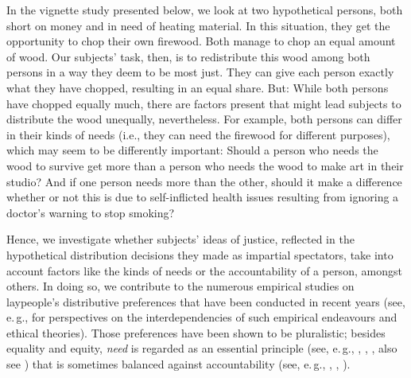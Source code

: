 \documentclass[egregdoesnotlikesansseriftitles]{scrartcl}
\begin{document}
In the vignette study presented below, we look at two hypothetical persons, both short on money and in need of heating material.
In this situation, they get the opportunity to chop their own firewood.
Both manage to chop an equal amount of wood.
Our subjects' task, then, is to redistribute this wood among both persons in a way they deem to be most just.
They can give each person exactly what they have chopped, resulting in an equal share.
But: While both persons have chopped equally much, there are factors present that might lead subjects to distribute the wood unequally, nevertheless.
For example, both persons can differ in their kinds of needs (i.e., they can need the firewood for different purposes), which may seem to be differently important: Should a person who needs the wood to survive get more than a person who needs the wood to make art in their studio?
And if one person needs more than the other, should it make a difference whether or not this is due to self-inflicted health issues resulting from ignoring a doctor's warning to stop smoking?

Hence, we investigate whether subjects' ideas of justice, reflected in the hypothetical distribution decisions they made as impartial spectators, take into account factors like the kinds of needs or the accountability of a person, amongst others.
In doing so, we contribute to the numerous empirical studies on laypeople's distributive preferences that have been conducted in recent years (see, e.\,g., \citealt{bauer_philosophie_2019,bauer_empirical_2020} for perspectives on the interdependencies of such empirical endeavours and ethical theories).
Those preferences have been shown to be pluralistic; besides equality and equity, \textit{need} is regarded as an essential principle (see, e.\,g., \citealt{konow_fair_2001, konow_which_2003}, \citealt{weis_needs_2017}, \citealt{bauer_winter_2023}, also see \citealt{miller_needs-based_2020}) that is sometimes balanced against accountability (see, e.\,g., \citealt{konow_fair_2001}, \citealt{schwettmann_trading_2009}, \citealt{bauer_need_2022}).
\end{document}
